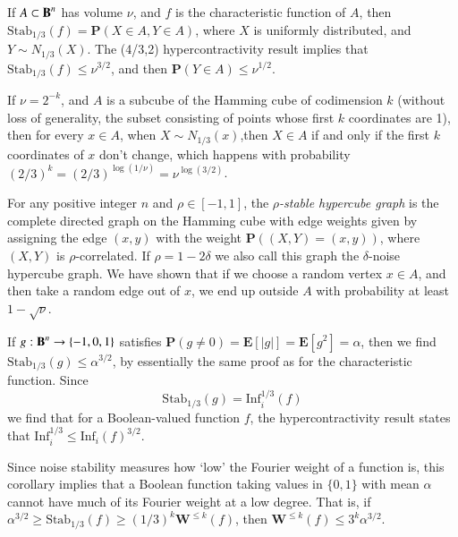 \begin{corollary}
    If $A \subset \operatorname{\mathbf{B}}^n$ has volume $\nu$, and $f$ is the characteristic function of $A$, then $\text{Stab}_{1/3}(f) = \mathbf{P}(X \in A, Y \in A)$, where $X$ is uniformly distributed, and $Y \sim N_{1/3}(X)$. The (4/3,2) hypercontractivity result implies that $\text{Stab}_{1/3}(f) \leq \nu^{3/2}$, and then $\mathbf{P}(Y \in A) \leq \nu^{1/2}$.
\end{corollary}

\begin{example}
    If $\nu = 2^{-k}$, and $A$ is a subcube of the Hamming cube of codimension $k$ (without loss of generality, the subset consisting of points whose first $k$ coordinates are 1), then for every $x \in A$, when $X \sim N_{1/3}(x)$,then $X \in A$ if and only if the first $k$ coordinates of $x$ don't change, which happens with probability $(2/3)^k = (2/3)^{\log(1/\nu)} = \nu^{\log(3/2)}$.
\end{example}

\begin{example}
    For any positive integer $n$ and $\rho \in [-1,1]$, the \emph{$\rho$-stable hypercube graph} is the complete directed graph on the Hamming cube with edge weights given by assigning the edge $(x,y)$ with the weight $\mathbf{P}((X,Y) = (x,y))$, where $(X,Y)$ is $\rho$-correlated. If $\rho = 1 - 2\delta$ we also call this graph the $\delta$-noise hypercube graph. We have shown that if we choose a random vertex $x \in A$, and then take a random edge out of $x$, we end up outside $A$ with probability at least $1 - \sqrt{\nu}$.
\end{example}

If $g: \operatorname{\mathbf{B}}^n \to \{ -1, 0 ,1 \}$ satisfies $\mathbf{P}(g \neq 0) = \mathbf{E}[|g|] = \mathbf{E}[g^2] = \alpha$, then we find $\text{Stab}_{1/3}(g) \leq \alpha^{3/2}$, by essentially the same proof as for the characteristic function. Since
%
\[ \text{Stab}_{1/3}(g) = \text{Inf}_i^{1/3}(f) \]
%
we find that for a Boolean-valued function $f$, the hypercontractivity result states that $\text{Inf}_i^{1/3} \leq \text{Inf}_i(f)^{3/2}$.

Since noise stability measures how `low' the Fourier weight of a function is, this corollary implies that a Boolean function taking values in $\{ 0, 1 \}$ with mean $\alpha$ cannot have much of its Fourier weight at a low degree. That is, if $\alpha^{3/2} \geq \text{Stab}_{1/3}(f) \geq (1/3)^k \mathbf{W}^{\leq k}(f)$, then $\mathbf{W}^{\leq k}(f) \leq 3^k \alpha^{3/2}$.

